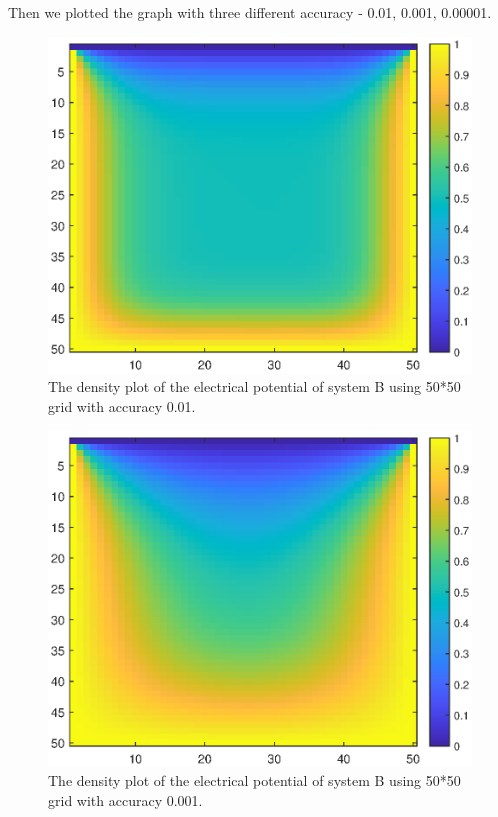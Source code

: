 \documentclass[12pt]{report}
\begin{document}
Then we plotted the graph with three different accuracy - 0.01, 0.001, 0.00001.
\begin{figure}[H]
    \centering
    \includegraphics[width=0.8\linewidth]{B001Density.eps}
    \caption{The density plot of the electrical potential of system B using 50*50 grid with accuracy 0.01.}
\end{figure}
\begin{figure}[H]
    \centering
    \includegraphics[width=0.8\linewidth]{B0001Density.eps}
    \caption{The density plot of the electrical potential of system B using 50*50 grid with accuracy 0.001.}
\end{figure}
\end{document}

